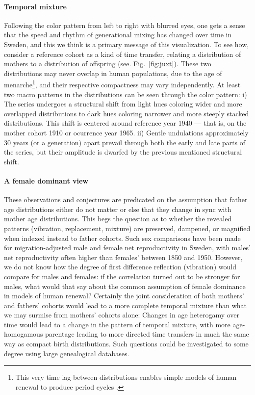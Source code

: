 \paragraph{Temporal mixture}
Following the color pattern from left to right with blurred eyes, one gets a sense that the speed and rhythm of generational mixing has changed over time in Sweden, and this we think is a primary message of this visualization. To see how, consider a reference cohort as a kind of time transfer, relating a distribution of mothers to a distribution of offspring (see. Fig.~\ref{fig:juxt}). These two distributions may never overlap in human populations, due to the age of menarche\footnote{This very time lag between distributions enables simple models of human renewal to produce period cycles \citep{wachter1991pre}.}, and their respective compactness may vary independently. At least two macro patterns in the distributions can be seen through the color pattern: i) The series undergoes a structural shift from light hues coloring wider and more overlapped distributions to dark hues coloring narrower and more steeply stacked distributions. This shift is centered around reference year 1940 --- that is, on the mother cohort 1910 or ocurrence year 1965. ii) Gentle undulations approximately 30 years (or a generation) apart prevail through both the early and late parts of the series, but their amplitude is dwarfed by the previous mentioned structural shift. 

\paragraph{A female dominant view}
These observations and conjectures are predicated on the assumption that father age distributions either do not matter or else that they change in sync with mother age distributions. This begs the question as to whether the revealed patterns (vibration, replacement, mixture) are preserved, dampened, or magnified when indexed instead to father cohorts. Such sex comparisons have been made for migration-adjusted male and female net reproductivity \citep{hyrenius1951reproduction} in Sweden, with males' net reproductivity often higher than females' between 1850 and 1950. However, we do not know how the degree of first difference reflection (vibration) would compare for males and females: if the correlation turned out to be stronger for males, what would that say about the common assumption of female dominance in models of human renewal? Certainly the joint consideration of both mothers' and fathers' cohorts would lead to a more complete temporal mixture than what we may surmise from mothers' cohorts alone: Changes in age heterogamy over time would lead to a change in the pattern of temporal mixture, with more age-homogamous parentage leading to more directed time transfers in much the same way as compact birth distributions. Such questions could be investigated to some degree using large genealogical databases.

